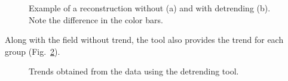 \begin{figure}[htpb]
\centering
{}
\caption[Example of a reconstruction without and with detrending.]{Example of a reconstruction without (a) and with detrending (b). Note the difference in the color bars.\label{fig:detrend1}}
\end{figure}

Along with the field without trend, the  tool also provides the trend for each group (Fig.~\ref{fig:detrend2}).

\begin{figure}[htpb]
\centering
{}
\caption{Trends obtained from the data using the detrending tool.\label{fig:detrend2}}
\end{figure}



